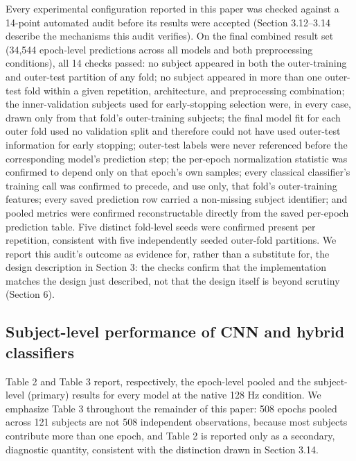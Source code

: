 \documentclass[a4paper,fleqn]{cas-sc}
\begin{document}
Every experimental configuration reported in this paper was checked against a 14-point automated audit before its results were accepted (Section 3.12--3.14 describe the mechanisms this audit verifies). On the final combined result set (34,544 epoch-level predictions across all models and both preprocessing conditions), all 14 checks passed: no subject appeared in both the outer-training and outer-test partition of any fold; no subject appeared in more than one outer-test fold within a given repetition, architecture, and preprocessing combination; the inner-validation subjects used for early-stopping selection were, in every case, drawn only from that fold's outer-training subjects; the final model fit for each outer fold used no validation split and therefore could not have used outer-test information for early stopping; outer-test labels were never referenced before the corresponding model's prediction step; the per-epoch normalization statistic was confirmed to depend only on that epoch's own samples; every classical classifier's training call was confirmed to precede, and use only, that fold's outer-training features; every saved prediction row carried a non-missing subject identifier; and pooled metrics were confirmed reconstructable directly from the saved per-epoch prediction table. Five distinct fold-level seeds were confirmed present per repetition, consistent with five independently seeded outer-fold partitions. We report this audit's outcome as evidence for, rather than a substitute for, the design description in Section 3: the checks confirm that the implementation matches the design just described, not that the design itself is beyond scrutiny (Section 6).



\subsection{Subject-level performance of CNN and hybrid classifiers}

Table 2 and Table 3 report, respectively, the epoch-level pooled and the subject-level (primary) results for every model at the native 128 Hz condition. We emphasize Table 3 throughout the remainder of this paper: 508 epochs pooled across 121 subjects are not 508 independent observations, because most subjects contribute more than one epoch, and Table 2 is reported only as a secondary, diagnostic quantity, consistent with the distinction drawn in Section 3.14.
\end{document}
